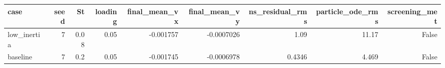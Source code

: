 \begin{tabular}{lrrrrrrrr}
\toprule
case & seed & St & loading & final\_mean\_vx & final\_mean\_vy & ns\_residual\_rms & particle\_ode\_rms & screening\_met \\
\midrule
low\_inertia & 7 & 0.08 & 0.05 & -0.001757 & -0.0007026 & 1.09 & 11.17 & False \\
baseline & 7 & 0.2 & 0.05 & -0.001745 & -0.0006978 & 0.4346 & 4.469 & False \\
\bottomrule
\end{tabular}
